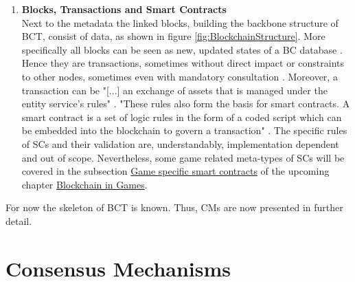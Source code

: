 \begin{enumerate}
	\item \textbf{Blocks, Transactions and Smart Contracts} \\
	Next to the metadata the linked blocks, building the backbone structure of \gls{BCT}, consist of data, as shown in figure \ref{fig:BlockchainStructure}.
	More specifically all blocks can be seen as new, updated states of a \gls{BC} database \cite[1]{Danzi.52018}.
	Hence they are transactions, sometimes without direct impact or constraints to other nodes, sometimes even with mandatory consultation \cite[1]{Danzi.52018}.
	Moreover, a transaction can be "[...] an exchange of assets that is managed under the entity service’s rules" \cite[51]{SultanK..2018}.
	"These rules also form the basis for smart contracts.
	A smart contract is a set of logic rules in the form of a coded script which can be embedded into the blockchain to govern a transaction" \cite[51]{SultanK..2018}.
	The specific rules of \gls{SC}s and their validation are, understandably, implementation dependent and out of scope.
	Nevertheless, some game related meta-types of \gls{SC}s will be covered
	in the subsection \hyperref[sec:GSSCs]{Game specific smart contracts}
	of the upcoming	chapter \hyperref[chap:BlockchainInGames]{Blockchain in Games}.
\end{enumerate}
For now the skeleton of \gls{BCT} is known.
Thus, \gls{CM}s are now presented in further detail.



\FloatBarrier

\section{Consensus Mechanisms}
\label{sec:ConsensusMechanisms}


